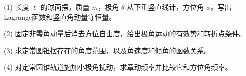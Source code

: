 (1) 长度 \(\ell\) 的球面摆，质量 \(m\)，极角 \(\theta\) 从下垂竖直线计，方位角 \(\phi\)。写出Lagrange函数和竖直角动量守恒量。

(2) 固定非零角动量后消去方位自由度，给出极角运动的有效势和转折点条件。

(3) 求定常圆锥摆存在的角度范围，以及角速度和倾角的函数关系。

(4) 对定常圆锥轨道施加小极角扰动，求章动频率并比较它和方位角频率。
